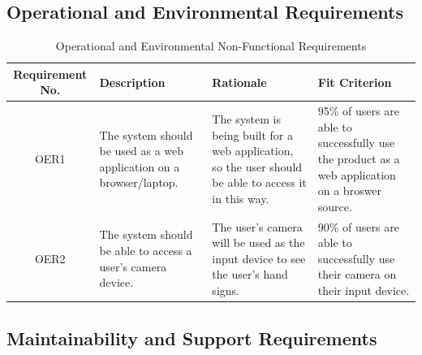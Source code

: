 \documentclass[12pt, titlepage]{article}
\begin{document}
\subsection{Operational and Environmental Requirements}

\begin{table}[H]
\caption{Operational and Environmental Non-Functional Requirements}
\noindent \begin{tabular}{| c | p{3cm}| p{3cm}| p{3cm}|}
\hline 
\textbf{Requirement No.} & \textbf{Description} & \textbf{Rationale} & \textbf{Fit Criterion}\\
\hline
OER1 & The system should be used as a web application on a browser/laptop. & The system is being built for a web application, so the user should be able to access it in this way. & 95\% of users are able to successfully use the product as a web application on a broswer source. \\
\hline
OER2 & The system should be able to access a user's camera device. & The user's camera will be used as the input device to see the user's hand signs. & 90\% of users are able to successfully use their camera on their input device. \\
\bottomrule
\end{tabular}
\end{table}

\subsection{Maintainability and Support Requirements}
\end{document}
